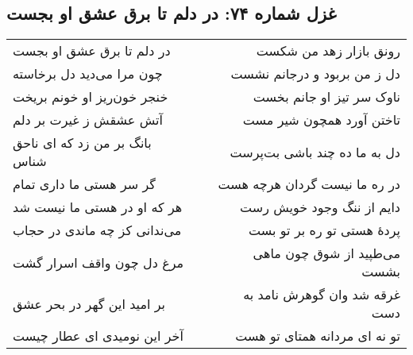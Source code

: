 \begin{center}
\section*{غزل شماره ۷۴: در دلم تا برق عشق او بجست}
\label{sec:074}
\begin{longtable}{l p{0.5cm} r}
در دلم تا برق عشق او بجست
&&
رونق بازار زهد من شکست
\\
چون مرا می‌دید دل برخاسته
&&
دل ز من بربود و درجانم نشست
\\
خنجر خون‌ریز او خونم بریخت
&&
ناوک سر تیز او جانم بخست
\\
آتش عشقش ز غیرت بر دلم
&&
تاختن آورد همچون شیر مست
\\
بانگ بر من زد که ای ناحق شناس
&&
دل به ما ده چند باشی بت‌پرست
\\
گر سر هستی ما داری تمام
&&
در ره ما نیست گردان هرچه هست
\\
هر که او در هستی ما نیست شد
&&
دایم از ننگ وجود خویش رست
\\
می‌ندانی کز چه ماندی در حجاب
&&
پردهٔ هستی تو ره بر تو بست
\\
مرغ دل چون واقف اسرار گشت
&&
می‌طپید از شوق چون ماهی بشست
\\
بر امید این گهر در بحر عشق
&&
غرقه شد وان گوهرش نامد به دست
\\
آخر این نومیدی ای عطار چیست
&&
تو نه ای مردانه همتای تو هست
\\
\end{longtable}
\end{center}
